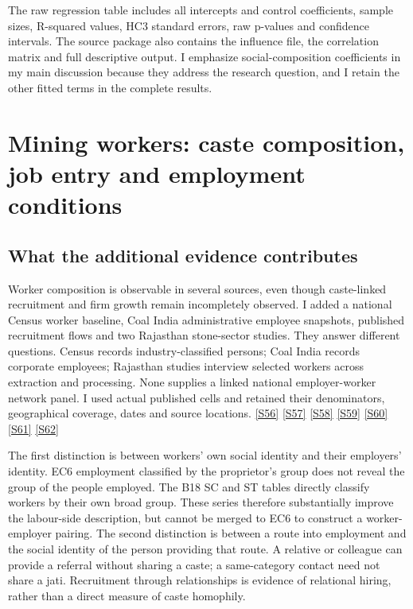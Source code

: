 \documentclass[11pt,a4paper]{report}
\begin{document}
The raw regression table includes all intercepts and control coefficients, sample sizes, R-squared values, HC3 standard errors, raw p-values and confidence intervals. The source package also contains the influence file, the correlation matrix and full descriptive output. I emphasize social-composition coefficients in my main discussion because they address the research question, and I retain the other fitted terms in the complete results.

\chapter{Mining workers: caste composition, job entry and employment conditions}
\section{What the additional evidence contributes}
Worker composition is observable in several sources, even though caste-linked recruitment and firm growth remain incompletely observed. I added a national Census worker baseline, Coal India administrative employee snapshots, published recruitment flows and two Rajasthan stone-sector studies. They answer different questions. Census records industry-classified persons; Coal India records corporate employees; Rajasthan studies interview selected workers across extraction and processing. None supplies a linked national employer-worker network panel. I used actual published cells and retained their denominators, geographical coverage, dates and source locations. \hyperlink{S56}{[S56]} \hyperlink{S57}{[S57]} \hyperlink{S58}{[S58]} \hyperlink{S59}{[S59]} \hyperlink{S60}{[S60]} \hyperlink{S61}{[S61]} \hyperlink{S62}{[S62]}

The first distinction is between workers' own social identity and their employers' identity. EC6 employment classified by the proprietor's group does not reveal the group of the people employed. The B18 SC and ST tables directly classify workers by their own broad group. These series therefore substantially improve the labour-side description, but cannot be merged to EC6 to construct a worker-employer pairing. The second distinction is between a route into employment and the social identity of the person providing that route. A relative or colleague can provide a referral without sharing a caste; a same-category contact need not share a jati. Recruitment through relationships is evidence of relational hiring, rather than a direct measure of caste homophily.
\end{document}
